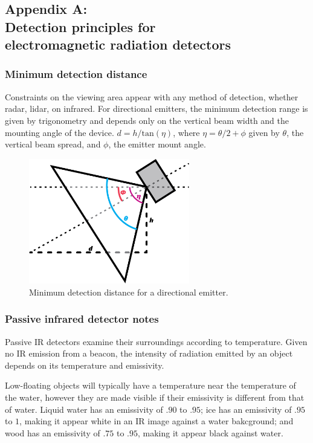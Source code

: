 \subsection*{Appendix A:\\Detection principles for\\electromagnetic radiation detectors} \label{app:AppendixA}
\subsubsection*{\label{sec:app:min-distance}Minimum detection distance}
Constraints on the viewing area appear with any method of detection, whether radar, lidar, on infrared. For directional emitters, the minimum detection range is given by trigonometry and depends only on the vertical beam width and the mounting angle of the device. $d = h/\text{tan}(\eta)$, where $\eta=\theta/2+\phi$ given by $\theta$, the vertical beam spread, and $\phi$, the emitter mount angle.
\begin{figure}
\includegraphics[width=70mm,natwidth=505,natheight=394]{"./image/directional-emitters"}
\caption[Minimum distance to detected obstacle.]{\label{fig:emitter-angle}Minimum detection distance for a directional emitter.}
\end{figure}

\subsubsection*{\label{sec:app:infrared-image}Passive infrared detector notes}
Passive IR detectors examine their surroundings according to temperature. Given no IR emission from a beacon, the intensity of radiation emitted by an object depends on its temperature and emissivity.

Low-floating objects will typically have a temperature near the temperature of the water, however they are made visible if their emissivity is different from that of water. Liquid water has an emissivity of $.90$ to $.95$; ice has an emissivity of $.95$ to $1$, making it appear white in an IR image against a water bakcground; and wood has an emissivity of $.75$ to $.95$, making it appear black against water. \cite{optotherm-emisstable}
